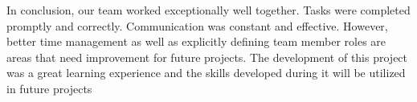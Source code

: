 \documentclass{article}
\begin{document}
In conclusion, our team worked exceptionally well together. Tasks were completed promptly and correctly. Communication was constant and effective. However, better time management as well as explicitly defining team member roles are areas that need improvement for future projects. The development of this project was a great learning experience and the skills developed during it will be utilized in future projects
	
\end{document}

